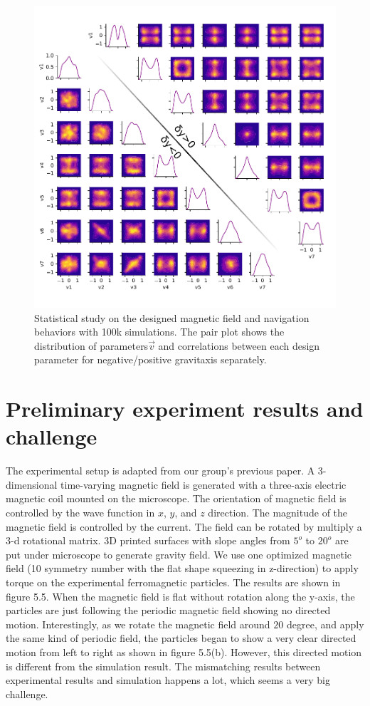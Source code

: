  
 \begin{figure}[p]
\centering
\includegraphics[width=16cm]{figures/5_4.pdf}
\caption{ Statistical study on the designed magnetic field and navigation behaviors with 100k simulations. The pair plot shows the distribution of parameters$\vec{v}$ and correlations between each design parameter for negative/positive gravitaxis separately.}
\label{fig:1}
\end{figure}
 
 
 
 \section{Preliminary experiment results and challenge}
 The experimental setup is adapted from our group's previous paper\autocite{fei2018magneto, fei2019magneto}. A 3-dimensional time-varying magnetic field is generated with a three-axis electric magnetic coil mounted on the microscope. The orientation of magnetic field is controlled by the wave function in $x$, $y$, and $z$ direction. The magnitude of the magnetic field is controlled by the current. The field can be rotated by multiply a 3-d rotational matrix. 3D printed  surfaces with slope angles from $5^o$ to  $20^o$ are put under microscope to generate gravity field. We use one optimized magnetic field (10 symmetry number with the flat shape  squeezing in z-direction) to apply torque on the experimental ferromagnetic particles. The results are shown in figure 5.5. When the magnetic field is flat without rotation along the y-axis, the particles are just following the periodic magnetic field showing no directed motion. Interestingly, as we rotate the magnetic field around $20$ degree, and apply the same kind of periodic field, the particles began to show a very clear directed motion from left to right as shown in figure 5.5(b). However, this directed motion is different from the simulation result. The mismatching results between experimental results and simulation happens a lot, which seems a very big challenge. 
 
